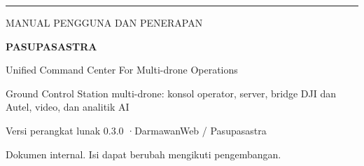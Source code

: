 \documentclass[11pt,a4paper,oneside]{report}
\begin{document}
\begin{titlepage}
\pagecolor{navy}\color{white}
\vspace*{3cm}
{\color{cyan}\rule{4cm}{5pt}}\par\vspace{1cm}
{\large\color{cyan} MANUAL PENGGUNA DAN PENERAPAN}\par\vspace{0.6cm}
{\fontsize{46}{50}\selectfont\bfseries PASUPASASTRA}\par\vspace{0.4cm}
{\LARGE Unified Command Center For Multi-drone Operations}\par\vspace{2cm}
{\large Ground Control Station multi-drone: konsol operator, server, bridge DJI dan Autel, video, dan analitik AI}\par
\vfill
{\color{cyan!60!white}\large Versi perangkat lunak 0.3.0 \quad·\quad DarmawanWeb / Pasupasastra}\par
{\color{cyan!60!white} Dokumen internal. Isi dapat berubah mengikuti pengembangan.}
\end{titlepage}
\pagecolor{white}\color{black}
\tableofcontents











\appendix


\end{document}
